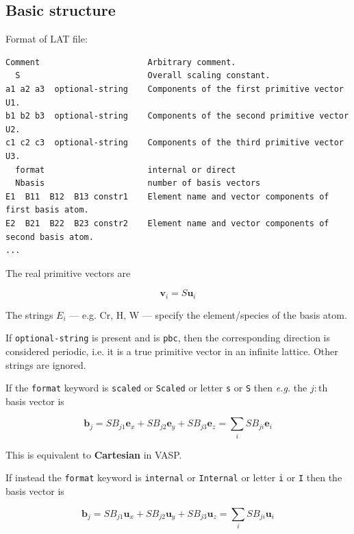 \documentclass[a4paper,12pt,pdftex,onecolumn]{article}
\newcommand{\eg}{\emph{e.g.}\xspace}
\begin{document}
\subsection{Basic structure}

Format of LAT file:

\begin{Verbatim}[fontsize=\relsize{-1},frame=single]
Comment                      Arbitrary comment.
  S                          Overall scaling constant.
a1 a2 a3  optional-string    Components of the first primitive vector U1.
b1 b2 b3  optional-string    Components of the second primitive vector U2.
c1 c2 c3  optional-string    Components of the third primitive vector U3.
  format                     internal or direct
  Nbasis                     number of basis vectors
E1  B11  B12  B13 constr1    Element name and vector components of first basis atom.
E2  B21  B22  B23 constr2    Element name and vector components of second basis atom.
...
\end{Verbatim}

The real primitive vectors are

\begin{equation}
\mathbf{v}_i = S \mathbf{u}_i
\end{equation}

The strings $E_i$ --- e.g. Cr, H, W --- specify the element/species of the basis atom.

If \verb+optional-string+ is present and is \verb+pbc+, then
the corresponding direction is
considered periodic, i.e. it is a true primitive vector
in an infinite lattice. Other strings are ignored.

If the \verb+format+ keyword is \verb+scaled+ or \verb+Scaled+ or
letter \verb+s+ or \verb+S+ then \eg the $j:$th basis vector is

\begin{equation}
\mathbf{b}_j = S B_{j1} \mathbf{e}_x
+ S B_{j2} \mathbf{e}_y
+ S B_{j3} \mathbf{e}_z
= \sum_i S B_{ji} \mathbf{e}_i
\end{equation}

This is equivalent to \textbf{Cartesian} in VASP.

If instead the \verb+format+ keyword is \verb+internal+ or \verb+Internal+
or letter \verb+i+ or \verb+I+ then the basis vector is

\begin{equation}
\mathbf{b}_j = S B_{j1} \mathbf{u}_x
+ S B_{j2} \mathbf{u}_y
+ S B_{j3} \mathbf{u}_z
= \sum_i S B_{ji} \mathbf{u}_i
\end{equation}
\end{document}
